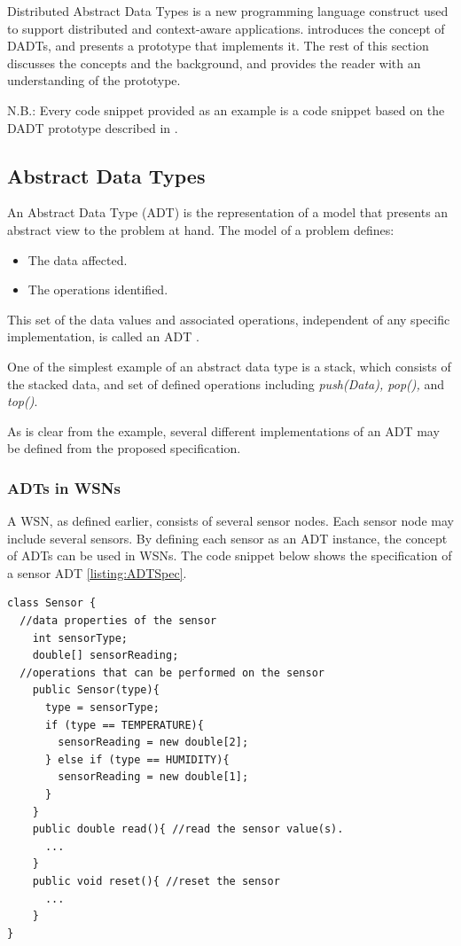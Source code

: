 Distributed Abstract Data Types is a new programming language construct used to
support distributed and context-aware applications. \cite{migliavacca_DADT:2006}
introduces the concept of DADTs, and presents a prototype that implements it.
The rest of this section discusses the concepts and the background, and
provides the reader with an understanding of the prototype.

N.B.: Every code snippet provided as an example is a code snippet based on the
DADT prototype described in \cite{migliavacca_DADT:2006}.

\subsection{Abstract Data Types}
An Abstract Data Type (ADT) is the representation of a model that presents an
abstract view to the problem at hand. The model of a problem defines:

\begin{itemize}
  \item The data affected.
  \item The operations identified.
\end{itemize}

This set of the data values and associated operations, independent of any
specific implementation, is called an ADT \cite{NIST_website}. 

One of the simplest example of an abstract data type is a stack, which
consists of the stacked data, and set of defined operations including \emph{push(Data), pop(),}
and \emph{top()}.

As is clear from the example, several different implementations of an ADT may
be defined from the proposed specification.

\subsubsection{ADTs in WSNs} \label{subsubsec:ADTsinWSN}

A WSN, as defined earlier, consists of several sensor nodes. Each sensor node
may include several sensors. By defining each sensor as
an ADT instance, the concept of ADTs can be used in WSNs. The code snippet below
shows the specification of a sensor ADT \ref{listing:ADTSpec}.   
  
\lstset{language = Java}  
 \begin{lstlisting}[frame=trbl, basewidth={0.55em, 0.6em}, captionpos=b, basicstyle=\ttfamily\footnotesize, breaklines, caption = Sensor ADT specification (reproduced from \cite{migliavacca_DADT:2006}), label = listing:ADTSpec ]
class Sensor {
  //data properties of the sensor 
    int sensorType;
    double[] sensorReading;
  //operations that can be performed on the sensor  
	public Sensor(type){
	  type = sensorType;
	  if (type == TEMPERATURE){
		sensorReading = new double[2];
	  }	else if (type == HUMIDITY){
		sensorReading = new double[1];
	  }
	}
    public double read(){ //read the sensor value(s).
	  ...
	} 
	public void reset(){ //reset the sensor
	  ...
	}
}
\end{lstlisting}

